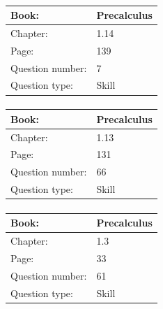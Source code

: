\documentclass{article}
\begin{document}
            \paragraph{}
            \begin{tabularx}{1\textwidth}{
                    p{}
                    p{}
                }
                \toprule
                Book: & Precalculus
                \\
                \midrule
                Chapter: & 1.14
                \\
                \midrule
                Page: & 139
                \\
                \midrule
                Question number: & 7
                \\
                \midrule
                Question type: & Skill
                \\
                \bottomrule
            \end{tabularx}
            
            \paragraph{}
            \begin{tabularx}{1\textwidth}{
                    p{}
                    p{}
                }
                \toprule
                Book: & Precalculus
                \\
                \midrule
                Chapter: & 1.13
                \\
                \midrule
                Page: & 131
                \\
                \midrule
                Question number: & 66
                \\
                \midrule
                Question type: & Skill
                \\
                \bottomrule
            \end{tabularx}
            
            \paragraph{}
            \begin{tabularx}{1\textwidth}{
                    p{}
                    p{}
                }
                \toprule
                Book: & Precalculus
                \\
                \midrule
                Chapter: & 1.3
                \\
                \midrule
                Page: & 33
                \\
                \midrule
                Question number: & 61
                \\
                \midrule
                Question type: & Skill
                \\
                \bottomrule
            \end{tabularx}
            
\end{document}
